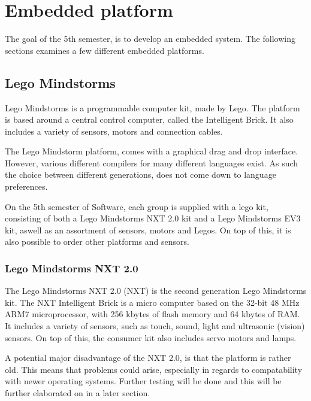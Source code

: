 \section{Embedded platform}
The goal of the 5th semester, is to develop an embedded system.
The following sections examines a few different embedded platforms.

\subsection{Lego Mindstorms}
Lego Mindstorms is a programmable computer kit, made by Lego.
The platform is based around a central control computer, called the Intelligent Brick.
It also includes a variety of sensors, motors and connection cables.

The Lego Mindstorm platform, comes with a graphical drag and drop interface.
However, various different compilers for many different languages exist.
As such the choice between different generations, does not come down to language preferences.

On the 5th semester of Software, each group is supplied with a lego kit, consisting of both a Lego Mindstorms NXT 2.0 kit and a Lego Mindstorms EV3 kit, aswell as an assortment of sensors, motors and Legos.
On top of this, it is also possible to order other platforms and sensors.

\subsubsection{Lego Mindstorms NXT 2.0}
The Lego Mindstorms NXT 2.0 (NXT) is the second generation Lego Mindstorms kit.
The NXT Intelligent Brick is a micro computer based on the 32-bit 48 MHz ARM7 microprocessor, with 256 kbytes of flash memory and 64 kbytes of RAM\cite{nxt2userguide}\cite{nxt2ev3compare}.
It includes a variety of sensors, such as touch, sound, light and ultrasonic (vision) sensors.
On top of this, the consumer kit also includes servo motors and lamps.

A potential major disadvantage of the NXT 2.0, is that the platform is rather old.
This means that problems could arise, especially in regards to compatability with newer operating systems.
Further testing will be done and this will be further elaborated on in a later section.

